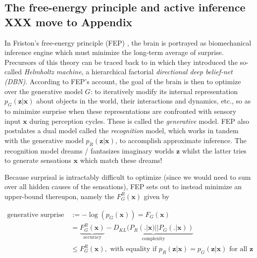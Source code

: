\documentclass[10pt,letterpaper]{article}
\def\z{\mathbf{z}}
\def\x{\mathbf{x}}
\begin{document}
\subsection{The free-energy principle and active inference \textbf{XXX move to Appendix}}
In Friston's free-energy principle (FEP) \citep{friston2010free,fristonAIorRL}, the brain is portrayed
as biomechanical inference engine which must minimize the long-term average of surprise.
Precursors of this theory can be traced back to \citep{dayan1995helmholtz} in which they introduced the so-called \textit{Helmholtz machine}, a hierarchical factorial \textit{directional deep belief-net (DBN)}. According to FEP's account, the goal of the brain is then to optimize over the generative model $G$: to iteratively
modify its internal representation $p_G(\z|\x)$ about objects in the world, their interactions and dynamics, etc., so as to minimize surprise when these representations are confronted with sensory input $\x$ during perception cycles. These is called the \textit{generative} model. FEP also postulates a dual model called the \textit{recognition} model,
which works in tandem with the generative model $p_R(\z|\x)$, to accomplish approximate inference. The recognition model dreams / fantasizes imaginary worlds $\z$ whilst the latter tries to generate sensations $\x$ which match these dreams!

Because surprisal is intractably difficult to optimize (since we would need to sum over all hidden causes of the sensations), FEP sets out to instead minimize an upper-bound thereupon, namely the  $F_G^R(\x)$ given by

  \begin{equation}
    \begin{split}
      \text{generative surprise } &:= -\log(p_G(\x)) = F_G(\x) \\
      &=\underbrace{F^R_G(\x)}_{\text{accuracy}} - \underbrace{D_{KL}(P_R(.|\x) || P_G(.|\x))}_{\text{complexity}} \\
      &\le F^R_G(\x),
      \text{ with equality if }p_R(\z|\x) = p_G(\z|\x)\text{ for all } \z
    \end{split}
  \end{equation}
\end{document}
